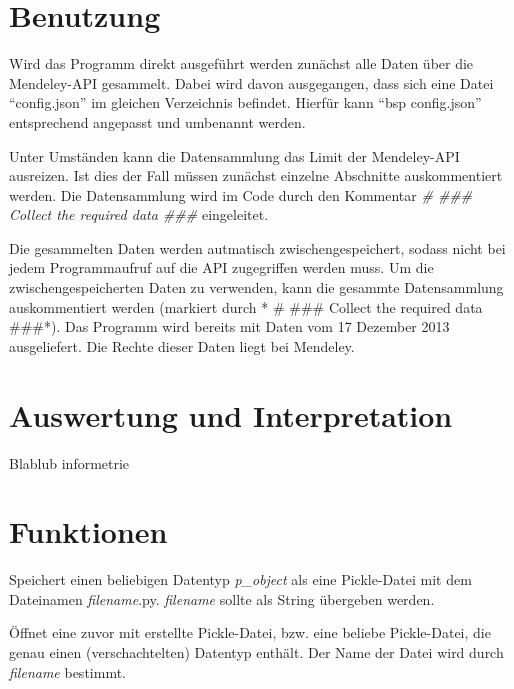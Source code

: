 \documentclass[letterpaper,10pt,english]{sphinxmanual}
\begin{document}
\section{Benutzung}
\label{project_3:benutzung}
Wird das Programm direkt ausgeführt werden zunächst alle Daten über die Mendeley-API gesammelt. Dabei wird davon ausgegangen, dass sich eine Datei ``config.json'' im gleichen Verzeichnis befindet. Hierfür kann ``bsp config.json'' entsprechend angepasst und umbenannt werden.

Unter Umständen kann die Datensammlung das Limit der Mendeley-API ausreizen. Ist dies der Fall müssen zunächst einzelne Abschnitte auskommentiert werden. Die Datensammlung wird im Code durch den Kommentar \emph{\# \#\#\# Collect the required data \#\#\#} eingeleitet.

Die gesammelten Daten werden autmatisch zwischengespeichert, sodass nicht bei jedem Programmaufruf auf die API zugegriffen werden muss. Um die zwischengespeicherten Daten zu verwenden, kann die gesammte Datensammlung auskommentiert werden (markiert durch * \# \#\#\# Collect the required data \#\#\#*).
Das Programm wird bereits mit Daten vom 17 Dezember 2013 ausgeliefert. Die Rechte dieser Daten liegt bei Mendeley.


\section{Auswertung und Interpretation}
\label{project_3:auswertung-und-interpretation}
Blablub informetrie


\section{Funktionen}
\label{project_3:funktionen}

\begin{fulllineitems}
\label{project_3:project_3.save_as_pickle}
Speichert einen beliebigen Datentyp \emph{p\_object} als eine Pickle-Datei mit dem Dateinamen \emph{filename}.py. \emph{filename} sollte als String übergeben werden.

\end{fulllineitems}


\begin{fulllineitems}
\label{project_3:project_3.open_from_pickle}
Öffnet eine zuvor mit {\hyperref[project_3:project_3.save_as_pickle]{}} erstellte Pickle-Datei, bzw. eine beliebe Pickle-Datei, die genau einen (verschachtelten) Datentyp enthält. Der Name der Datei wird durch \emph{filename} bestimmt.

\end{fulllineitems}
\end{document}
